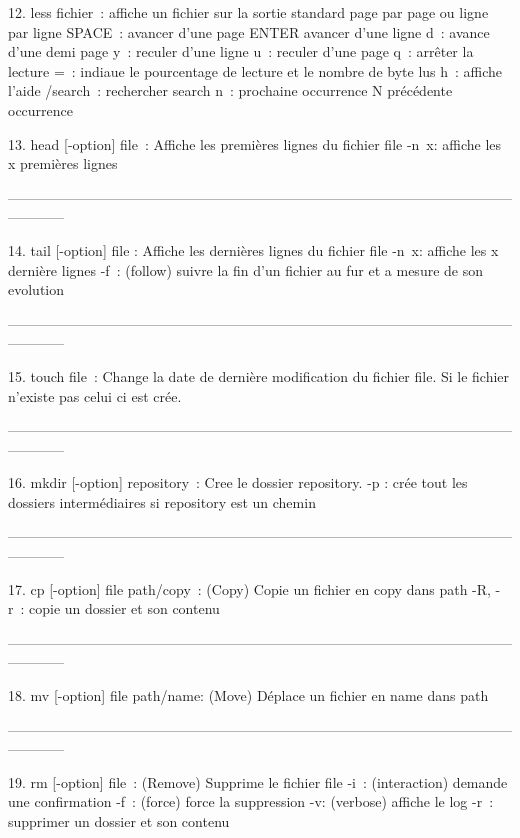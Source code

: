 \documentclass[a4paper, 10pt, onecolumn, openright, oneside]{book}
\begin{document}
    12. less fichier : affiche un fichier sur la sortie standard page par page ou ligne par ligne
SPACE : avancer d’une page
ENTER avancer d’une ligne
d : avance d’une demi page
y : reculer d’une ligne
u : reculer d’une page
q : arrêter la lecture
= : indiaue le pourcentage de lecture et le nombre de byte lus
h : affiche l’aide
/search : rechercher search
n : prochaine occurrence 
N précédente occurrence

    13. head [-option] file : Affiche les premières lignes du fichier file
-n x: affiche les x premières lignes

------------------------------------------------------------------------------------------------------------------------

    14. tail [-option] file : Affiche les dernières lignes du fichier file
-n x: affiche les x dernière lignes
-f : (follow) suivre la fin d’un fichier au fur et a mesure de son evolution

------------------------------------------------------------------------------------------------------------------------

    15. touch file : Change la date de dernière modification du fichier file. Si le fichier n’existe pas celui ci est crée.

------------------------------------------------------------------------------------------------------------------------

    16. mkdir [-option] repository : Cree le dossier repository.
-p : crée tout les dossiers intermédiaires si repository est un chemin

------------------------------------------------------------------------------------------------------------------------

    17. cp [-option] file path/copy : (Copy) Copie un fichier en copy dans path
-R, -r : copie un dossier et son contenu

------------------------------------------------------------------------------------------------------------------------

    18. mv  [-option] file path/name: (Move) Déplace un fichier en name dans path

------------------------------------------------------------------------------------------------------------------------

    19. rm [-option] file : (Remove) Supprime le fichier file
-i : (interaction) demande une confirmation
-f : (force) force la suppression
-v: (verbose) affiche le log
-r : supprimer un dossier et son contenu
\end{document}

